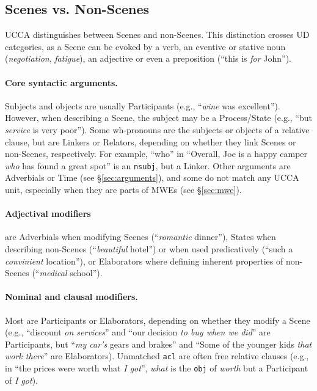 \documentclass[11pt,a4paper]{article}
\begin{document}
\subsection{Scenes vs. Non-Scenes}\label{sec:s}

UCCA distinguishes between Scenes and non-Scenes.
This distinction crosses UD categories,
as a Scene can be evoked by a verb, an eventive or stative
noun (\textit{negotiation}, \textit{fatigue}),
an adjective or even a preposition (``this is \textit{for} John'').

\paragraph{Core syntactic arguments.}
      Subjects and objects are usually Participants (e.g., ``\textit{wine} was excellent'').
      However, when describing a Scene, the subject may be a Process/State
      (e.g., ``but \textit{service} is very poor'').
      Some wh-pronouns are the subjects or objects of a relative clause, but
      are Linkers or Relators,
      depending on whether they link Scenes or non-Scenes, respectively.
      For example, ``who'' in ``Overall, Joe is a happy camper \textit{who} has found a great spot'' is an \texttt{nsubj}, but a Linker.
      Other arguments are Adverbials or Time (see \S\ref{sec:arguments}), and
      some do not match any UCCA unit, especially when they are parts of MWEs (see \S\ref{sec:mwe}).

\paragraph{Adjectival modifiers} are Adverbials when modifying Scenes
    (``\textit{romantic} dinner''), States when describing non-Scenes (``\textit{beautiful} hotel'') 
    or when used predicatively (``such a \textit{convinient} location''), or
    Elaborators where defining inherent properties of non-Scenes (``\textit{medical} school'').

\paragraph{Nominal and clausal modifiers.}
    Most are Participants or Elaborators,
    depending on whether they modify a Scene (e.g.,
    ``discount \textit{on services}'' and
    ``our decision \textit{to buy when we did}'' are Participants,
    but ``\textit{my car's} gears and brakes'' and ``Some of the younger kids \textit{that work there}'' are Elaborators).
    Unmatched \texttt{acl} are often
    free relative clauses (e.g., in ``the prices were worth what \textit{I got}'',
    \textit{what} is the \texttt{obj} of \textit{worth} but
    a Participant of \textit{I got}).
\end{document}
